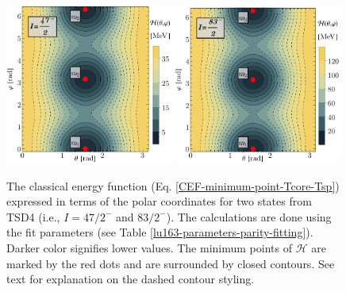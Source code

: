 \begin{figure}
    \centering
    \includegraphics[width=0.49\textwidth]{Chapters/Figures/parity-partners-plots/contour-tsd4-1.pdf}
    \includegraphics[width=0.49\textwidth]{Chapters/Figures/parity-partners-plots/contour-tsd4-2.pdf}
    \caption{The classical energy function (Eq. \ref{CEF-minimum-point-Tcore-Tsp}) expressed in terms of the polar coordinates for two states from TSD4 (i.e., $I=47/2^-$ and $83/2^-$). The calculations are done using the fit parameters (see Table \ref{lu163-parameters-parity-fitting}). Darker color signifies lower values. The minimum points of $\mathcal{H}$ are marked by the red dots and are surrounded by closed contours. See text for explanation on the dashed contour styling.}
    \label{contour-cef-polar-tsd4}
\end{figure}

